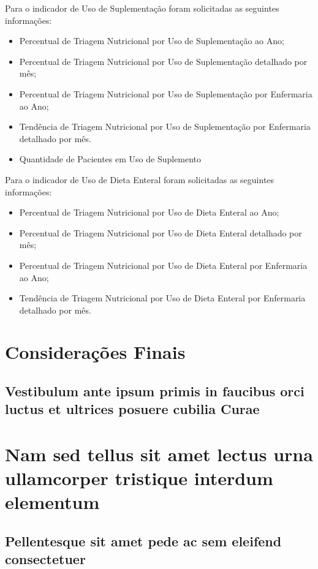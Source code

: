 Para o indicador de Uso de Suplementação foram solicitadas as seguintes informações:
\begin{itemize}
    \item Percentual de Triagem Nutricional por Uso de Suplementação ao Ano;
    \item Percentual de Triagem Nutricional por Uso de Suplementação detalhado por mês;
    \item Percentual de Triagem Nutricional por Uso de Suplementação por Enfermaria ao Ano;
    \item Tendência de Triagem Nutricional por Uso de Suplementação por Enfermaria detalhado por mês.
    \item Quantidade de Pacientes em Uso de Suplemento
\end{itemize}

Para o indicador de Uso de Dieta Enteral foram solicitadas as seguintes informações:
\begin{itemize}
    \item Percentual de Triagem Nutricional por Uso de Dieta Enteral ao Ano;
    \item Percentual de Triagem Nutricional por Uso de Dieta Enteral detalhado por mês;
    \item Percentual de Triagem Nutricional por Uso de Dieta Enteral por Enfermaria ao Ano;
    \item Tendência de Triagem Nutricional por Uso de Dieta Enteral por Enfermaria detalhado por mês.
\end{itemize}

\chapter{Considerações Finais}

\section{Vestibulum ante ipsum primis in faucibus orci luctus et ultrices
posuere cubilia Curae}

\lipsum[21-22]

\chapter{Nam sed tellus sit amet lectus urna ullamcorper tristique interdum
elementum}

\section{Pellentesque sit amet pede ac sem eleifend consectetuer}

\lipsum[24]